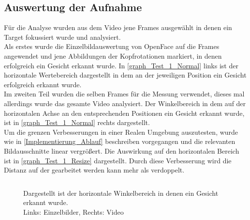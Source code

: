 \subsection{Auswertung der Aufnahme}
Für die Analyse wurden aus dem Video jene Frames ausgewählt in denen ein Target fokussiert wurde und analysiert.\\
Als erstes wurde die Einzelbildauswertung von OpenFace auf die Frames angewendet und jene Abbildungen der Kopfrotationen markiert, in denen erfolgreich ein Gesicht erkannt wurde. In \autoref{graph_Test_1_Normal} links ist der horizontale Wertebereich dargestellt in dem an der jeweiligen Position ein Gesicht erfolgreich erkannt wurde.\\
Im zweiten Teil wurden die selben Frames für die Messung verwendet, dieses mal allerdings wurde das gesamte Video analysiert. Der Winkelbereich in dem auf der horizontalen Achse an den entsprechenden Positionen ein Gesicht erkannt wurde, ist in \autoref{graph_Test_1_Normal} rechts dargestellt.\\
Um die grenzen Verbesserungen in einer Realen Umgebung auszutesten, wurde wie in \autoref{Implementierung_Ablauf} beschreiben vorgegangen und die relevanten Bildausschnitte linear vergrößert. Die Auswirkung auf den horizontalen Bereich ist in \autoref{graph_Test_1_Resize} dargestellt. Durch diese Verbesserung wird die Distanz auf der gearbeitet werden kann mehr als verdoppelt.
\begin{figure}
	\centering
	\begin{tabular}{ll}
	
	
	\end{tabular}
	\caption{Dargestellt ist der horizontale Winkelbereich in denen ein Gesicht erkannt wurde.\\
	Links: Einzelbilder, Rechts: Video}
	\label{graph_Test_1_Normal}
\end{figure}
